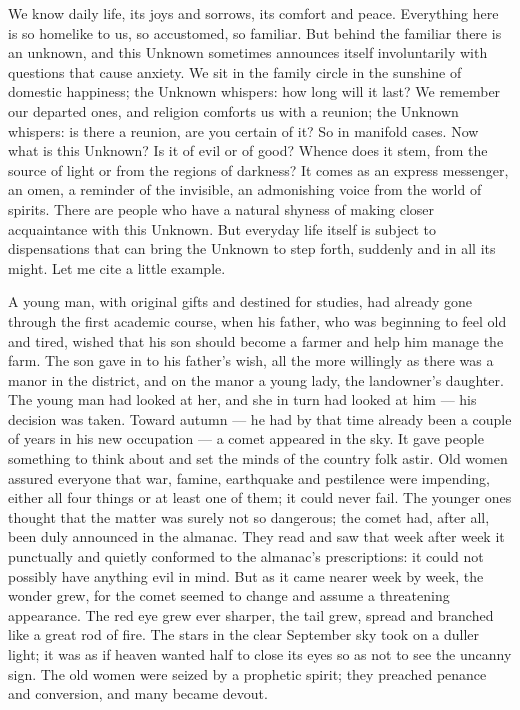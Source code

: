 \documentclass[12pt,a4paper,openany]{book}
\newcommand{\opage}[1]{\marginnote{\footnotesize\textit{[#1]}}}
\begin{document}
We know daily life, its joys and sorrows, its comfort and peace. Everything here is so homelike to us, so accustomed,
so familiar. But behind the familiar there is an unknown, and this Unknown sometimes announces itself involuntarily
with questions that cause anxiety. We sit in the family circle in the sunshine of domestic happiness; the Unknown
whispers: how long will it last? We remember our departed ones, and religion comforts us with a reunion; the Unknown
whispers: is there a reunion, are you certain of it? So in manifold cases. Now what is this Unknown? Is it of evil or
of good? Whence does it stem, from the source of light or from the regions of darkness? It comes as an express
messenger, an omen, a reminder of the invisible, an admonishing voice from the world of spirits. There are people who
have a natural shyness of making closer acquaintance with this Unknown. But everyday life itself is subject to
dispensations that can bring the Unknown to step forth, suddenly and in all its might. Let me cite a little example.

A young man, with original gifts and destined for studies, had already gone through the
\setcounter{footnote}{0}%
\opage{2}first academic course, when his father, who was beginning to feel old and tired, wished that his son should
become a farmer and help him manage the farm. The son gave in to his father's wish, all the more willingly as there was
a manor in the district, and on the manor a young lady, the landowner's daughter. The young man had looked at her, and
she in turn had looked at him --- his decision was taken. Toward autumn --- he had by that time already been a couple
of years in his new occupation --- a comet appeared in the sky. It gave people something to think about and set the
minds of the country folk astir. Old women assured everyone that war, famine, earthquake and pestilence were impending,
either all four things or at least one of them; it could never fail. The younger ones thought that the matter was surely
not so dangerous; the comet had, after all, been duly announced in the almanac. They read and saw that week after week
it punctually and quietly conformed to the almanac's prescriptions: it could not possibly have anything evil in mind.
But as it came nearer week by week, the wonder grew, for the comet seemed to change and assume a threatening
appearance. The red eye grew ever sharper, the tail grew, spread and branched like a great rod of fire. The stars in
the clear September sky took on a duller light; it was as if heaven wanted half to close its eyes so as not to see the
uncanny sign. The old women were seized by a prophetic spirit; they preached penance and conversion, and many became
devout.
\end{document}
